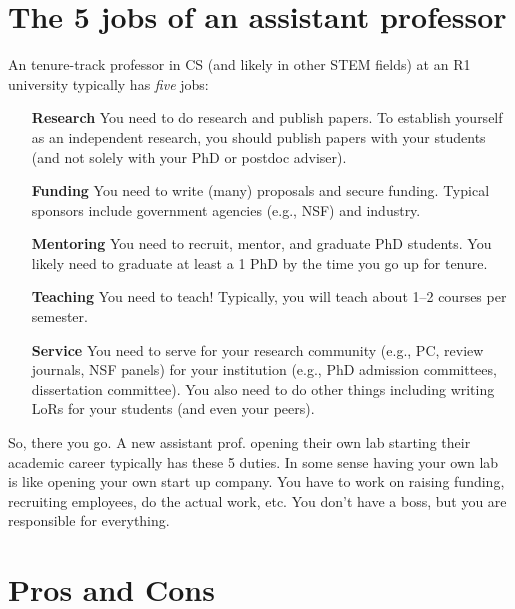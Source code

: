 \documentclass[oneside,11pt,dvipsnames]{book}
\begin{document}
\section{The 5 jobs of an assistant professor}
An tenure-track professor in CS (and likely in other STEM fields) at an R1 university typically has \emph{five} jobs:

\begin{enumerate}
\item[\textbf{Research}] You need to do research and publish papers.  To establish yourself as an independent research, you should publish papers with your students (and not solely with your PhD or postdoc adviser).

\item[\textbf{Funding}] You need to write (many) proposals and secure funding. Typical sponsors include government agencies (e.g., NSF) and industry.

\item[\textbf{Mentoring}] You need to recruit, mentor, and graduate PhD students.  You likely need to graduate at least a 1 PhD by the time you go up for tenure.

\item[\textbf{Teaching}] You need to teach! Typically, you will teach about 1--2 courses per semester.

  \item[\textbf{Service}]  You need to serve for your research community (e.g., PC, review journals, NSF panels) for your institution (e.g., PhD admission committees, dissertation committee).  You also need to do other things including writing LoRs for your students (and even your peers).


\end{enumerate}


So, there you go. A new assistant prof. opening their own lab starting their academic career typically has these 5 duties.  In some sense having your own lab is like opening your own start up company. You have to work on raising funding, recruiting employees, do the actual work, etc.  You don't have a boss, but you are responsible for everything.  


\section{Pros and Cons}
\end{document}
